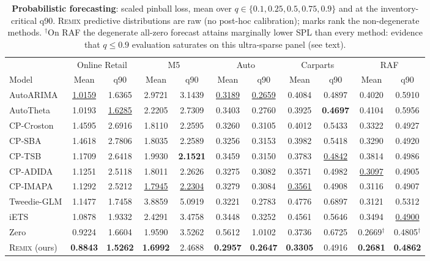 \documentclass[twocolumn,10pt]{article}
\newcommand{\REMIX}{\textsc{Remix}}
\newcommand{\best}[1]{\textbf{#1}}
\newcommand{\secondbest}[1]{\underline{#1}}
\begin{document}
\begin{table}[t]
\centering
\caption{\textbf{Probabilistic forecasting}: scaled pinball loss, mean
over $q\in\{0.1,0.25,0.5,0.75,0.9\}$ and at the inventory-critical q90.
\REMIX{} predictive distributions are raw (no post-hoc calibration);
marks rank the non-degenerate methods.
$^{\dagger}$On RAF the degenerate all-zero forecast attains marginally
lower SPL than every method: evidence that $q\le0.9$ evaluation
saturates on this ultra-sparse panel (see text).}
\label{tab:prob}
\small
\setlength{\tabcolsep}{3.2pt}
\begin{tabular}{lcc@{\hspace{9pt}}cc@{\hspace{9pt}}cc@{\hspace{9pt}}cc@{\hspace{9pt}}cc}
\toprule
 & \multicolumn{2}{c}{Online Retail} & \multicolumn{2}{c}{M5} & \multicolumn{2}{c}{Auto} & \multicolumn{2}{c}{Carparts} & \multicolumn{2}{c}{RAF}\\
\cmidrule(lr){2-3}\cmidrule(lr){4-5}\cmidrule(lr){6-7}\cmidrule(lr){8-9}\cmidrule(lr){10-11}
Model & Mean & q90 & Mean & q90 & Mean & q90 & Mean & q90 & Mean & q90\\
\midrule
AutoARIMA & \secondbest{1.0159} & 1.6365 & 2.9721 & 3.1439 & \secondbest{0.3189} & \secondbest{0.2659} & 0.4084 & 0.4897 & 0.4020 & 0.5910\\
AutoTheta & 1.0193 & \secondbest{1.6285} & 2.2205 & 2.7309 & 0.3403 & 0.2760 & 0.3925 & \best{0.4697} & 0.4104 & 0.5956\\
CP-Croston & 1.4595 & 2.6916 & 1.8110 & 2.2595 & 0.3260 & 0.3105 & 0.4012 & 0.5433 & 0.3322 & 0.4927\\
CP-SBA & 1.4618 & 2.7806 & 1.8035 & 2.2589 & 0.3256 & 0.3153 & 0.3982 & 0.5418 & 0.3290 & 0.4920\\
CP-TSB & 1.1709 & 2.6418 & 1.9930 & \best{2.1521} & 0.3459 & 0.3150 & 0.3783 & \secondbest{0.4842} & 0.3814 & 0.4986\\
CP-ADIDA & 1.1251 & 2.5118 & 1.8011 & 2.2626 & 0.3275 & 0.3082 & 0.3571 & 0.4982 & \secondbest{0.3097} & 0.4905\\
CP-IMAPA & 1.1292 & 2.5212 & \secondbest{1.7945} & \secondbest{2.2304} & 0.3279 & 0.3084 & \secondbest{0.3561} & 0.4908 & 0.3116 & 0.4907\\
Tweedie-GLM & 1.1477 & 1.7458 & 3.8859 & 5.0919 & 0.3221 & 0.2783 & 0.4776 & 0.6897 & 0.3121 & 0.5312\\
iETS & 1.0878 & 1.9332 & 2.4291 & 3.4758 & 0.3448 & 0.3252 & 0.4561 & 0.5646 & 0.3494 & \secondbest{0.4900}\\
\midrule
Zero & 0.9224 & 1.6604 & 1.9590 & 3.5262 & 0.5612 & 1.0102 & 0.3736 & 0.6725 & 0.2669$^{\dagger}$ & 0.4805$^{\dagger}$\\
\midrule
\REMIX{} (ours) & \best{0.8843} & \best{1.5262} & \best{1.6992} & 2.4688 & \best{0.2957} & \best{0.2647} & \best{0.3305} & 0.4916 & \best{0.2681} & \best{0.4862}\\
\bottomrule
\end{tabular}
\end{table}
\end{document}
